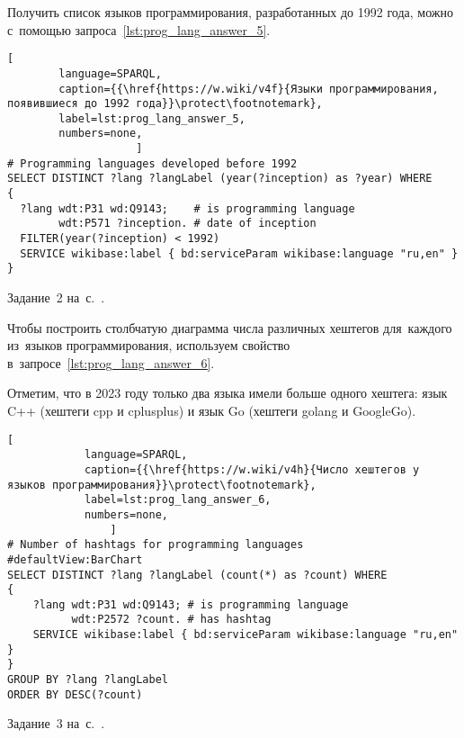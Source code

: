 \begin{task}
    \label{answer:prog_langs_5}
Получить список языков программирования, разработанных до 1992 года, 
    можно с~помощью запроса~\ref{lst:prog_lang_answer_5}. 

	\begin{lstlisting}[
        language=SPARQL, 
        caption={{\href{https://w.wiki/v4f}{Языки программирования, появившиеся до 1992 года}}\protect\footnotemark}, 
        label=lst:prog_lang_answer_5,
        numbers=none,
                    ]
# Programming languages developed before 1992
SELECT DISTINCT ?lang ?langLabel (year(?inception) as ?year) WHERE 
{
  ?lang wdt:P31 wd:Q9143;    # is programming language
        wdt:P571 ?inception. # date of inception
  FILTER(year(?inception) < 1992)
  SERVICE wikibase:label { bd:serviceParam wikibase:language "ru,en" }
}
\end{lstlisting}
    
\small{Задание~2 на~с.~\pageref{prog_lang_test}.}
\end{task}



\newpage
\begin{task}
    \label{answer:prog_langs_6}
    Чтобы построить столбчатую диаграмма числа различных хештегов 
    для~каждого из~языков программирования, 
    используем свойство  в~запросе~\ref{lst:prog_lang_answer_6}. 

    Отметим, что в 2023 году только два языка имели больше одного хештега: 
    язык C++ (хештеги cpp и cplusplus) и язык Go (хештеги golang и GoogleGo).

\begin{lstlisting}[
            language=SPARQL, 
            caption={{\href{https://w.wiki/v4h}{Число хештегов у языков программирования}}\protect\footnotemark}, 
            label=lst:prog_lang_answer_6,
            numbers=none,
                ]
# Number of hashtags for programming languages
#defaultView:BarChart
SELECT DISTINCT ?lang ?langLabel (count(*) as ?count) WHERE
{
    ?lang wdt:P31 wd:Q9143; # is programming language
          wdt:P2572 ?count. # has hashtag
    SERVICE wikibase:label { bd:serviceParam wikibase:language "ru,en" }
} 
GROUP BY ?lang ?langLabel
ORDER BY DESC(?count)
\end{lstlisting}
    
\small{Задание~3 на~с.~\pageref{prog_lang_test}.}
\end{task}





